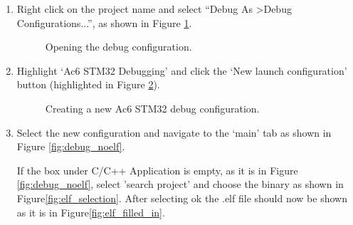 \documentclass{UoNMCHA}
\numberwithin{equation}{section}
\begin{document}
\begin{enumerate}
    \item Right click on the project name and select ``Debug As \textgreater Debug Configurations...'', as shown in Figure \ref{fig:debugicon}.
    
    \begin{figure}[H]
    \caption{Opening the debug configuration.}
    \label{fig:debugicon}
    \end{figure}

    \item Highlight `Ac6 STM32 Debugging' and click the `New launch configuration' button (highlighted in Figure \ref{fig:debugconfig}).

    \begin{figure}[H]
    \caption{Creating a new Ac6 STM32 debug configuration.}
    \label{fig:debugconfig}
    \end{figure}


    \item Select the new configuration and navigate to the `main' tab as shown in Figure \ref{fig:debug_noelf}.
    
    If the box under C/C++ Application is empty,  as it is in Figure \ref{fig:debug_noelf}, select 'search project' and choose the binary as shown in  Figure\ref{fig:elf_selection}. After selecting ok the .elf file should now be shown as it is in Figure\ref{fig:elf_filled_in}.
    

\end{enumerate}
\end{document}

